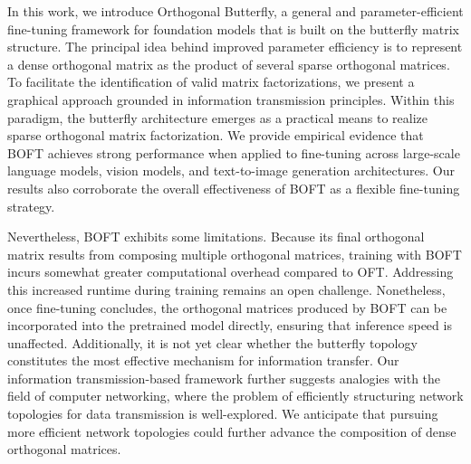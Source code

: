 In this work, we introduce Orthogonal Butterfly, a general and parameter-efficient fine-tuning framework for foundation models that is built on the butterfly matrix structure. The principal idea behind improved parameter efficiency is to represent a dense orthogonal matrix as the product of several sparse orthogonal matrices. To facilitate the identification of valid matrix factorizations, we present a graphical approach grounded in information transmission principles. Within this paradigm, the butterfly architecture emerges as a practical means to realize sparse orthogonal matrix factorization. We provide empirical evidence that BOFT achieves strong performance when applied to fine-tuning across large-scale language models, vision models, and text-to-image generation architectures. Our results also corroborate the overall effectiveness of BOFT as a flexible fine-tuning strategy.

Nevertheless, BOFT exhibits some limitations. Because its final orthogonal matrix results from composing multiple orthogonal matrices, training with BOFT incurs somewhat greater computational overhead compared to OFT. Addressing this increased runtime during training remains an open challenge. Nonetheless, once fine-tuning concludes, the orthogonal matrices produced by BOFT can be incorporated into the pretrained model directly, ensuring that inference speed is unaffected. Additionally, it is not yet clear whether the butterfly topology constitutes the most effective mechanism for information transfer. Our information transmission-based framework further suggests analogies with the field of computer networking, where the problem of efficiently structuring network topologies for data transmission is well-explored. We anticipate that pursuing more efficient network topologies could further advance the composition of dense orthogonal matrices.